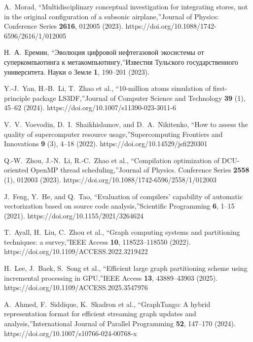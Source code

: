 \documentclass[
11pt,%
tightenlines,%
twoside,%
onecolumn,%
nofloats,%
nobibnotes,%
nofootinbib,%
superscriptaddress,%
noshowpacs,%
centertags]%
{revtex4}
\begin{document}
\begin{thebibliography}{99}
A.~Morad, \textquotedblleft Multidisciplinary conceptual investigation for integrating stores, not in the original configuration of a subsonic airplane,\textquotedblright Journal of Physics: Conference Series \textbf{2616}, 012005 (2023). https://doi.org/10.1088/1742-6596/2616/1/012005

Н.~А.~Еремин, \textquotedblleft Эволюция цифровой нефтегазовой экосистемы от суперкомпьютинга к метакомпьютингу,\textquotedblright Известия Тульского государственного университета. Науки о Земле \textbf{1}, 190--201 (2023).

Y.-J.~Yan, H.-B.~Li, T.~Zhao et al., \textquotedblleft 10-million atoms simulation of first-principle package LS3DF,\textquotedblright Journal of Computer Science and Technology \textbf{39} (1), 45--62 (2024). https://doi.org/10.1007/s11390-023-3011-6

V.~V.~Voevodin, D.~I.~Shaikhislamov, and D.~A.~Nikitenko, \textquotedblleft How to assess the quality of supercomputer resource usage,\textquotedblright Supercomputing Frontiers and Innovations \textbf{9} (3), 4--18 (2022). https://doi.org/10.14529/jsfi220301

Q.-W.~Zhou, J.-N.~Li, R.-C.~Zhao et al., \textquotedblleft Compilation optimization of DCU-oriented OpenMP thread scheduling,\textquotedblright Journal of Physics. Conference Series \textbf{2558} (1), 012003 (2023). https://doi.org/10.1088/1742-6596/2558/1/012003

J.~Feng, Y.~He, and Q.~Tao, \textquotedblleft Evaluation of compilers’ capability of automatic vectorization based on source code analysis,\textquotedblright Scientific Programming \textbf{6}, 1--15 (2021). https://doi.org/10.1155/2021/3264624

T.~Ayall, H.~Liu, C.~Zhou et al., \textquotedblleft Graph computing systems and partitioning techniques: a survey,\textquotedblright IEEE Access \textbf{10}, 118523--118550 (2022). https://doi.org/10.1109/ACCESS.2022.3219422

H.~Lee, J.~Baek, S.~Song et al., \textquotedblleft Efficient large graph partitioning scheme using incremental processing in GPU,\textquotedblright IEEE Access \textbf{13}, 43889--43903 (2025). https://doi.org/10.1109/ACCESS.2025.3547976

A.~Ahmed, F.~Siddique, K.~Skadron et al., \textquotedblleft GraphTango: A hybrid representation format for efficient streaming graph updates and analysis,\textquotedblright International Journal of Parallel Programming \textbf{52}, 147--170 (2024). https://doi.org/10.1007/s10766-024-00768-x


\end{thebibliography}
\end{document}
